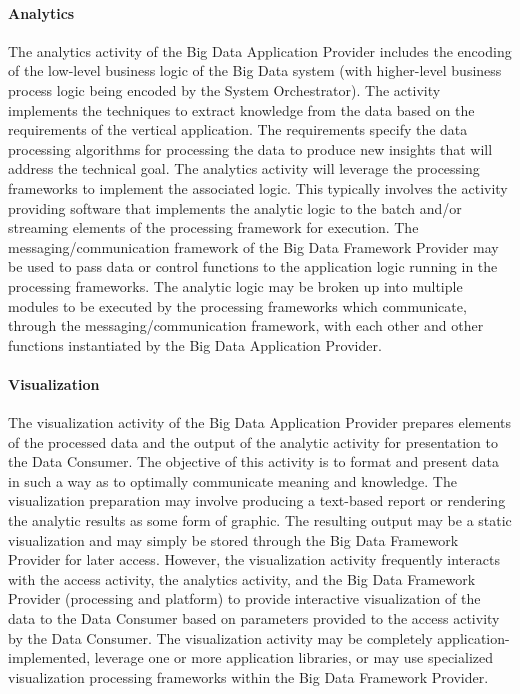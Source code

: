 \documentclass[10pt]{article}
\begin{document}
\paragraph{Analytics}

The analytics activity of the Big Data Application Provider includes
the encoding of the low-level business logic of the Big Data system
(with higher-level business process logic being encoded by the System
Orchestrator). The activity implements the techniques to extract
knowledge from the data based on the requirements of the vertical
application. The requirements specify the data processing algorithms
for processing the data to produce new insights that will address the
technical goal. The analytics activity will leverage the processing
frameworks to implement the associated logic. This typically involves
the activity providing software that implements the analytic logic to
the batch and/or streaming elements of the processing framework for
execution. The messaging/communication framework of the Big Data
Framework Provider may be used to pass data or control functions to
the application logic running in the processing frameworks. The
analytic logic may be broken up into multiple modules to be executed
by the processing frameworks which communicate, through the
messaging/communication framework, with each other and other functions
instantiated by the Big Data Application Provider.

\paragraph{Visualization}

The visualization activity of the Big Data Application Provider
prepares elements of the processed data and the output of the analytic
activity for presentation to the Data Consumer. The objective of this
activity is to format and present data in such a way as to optimally
communicate meaning and knowledge. The visualization preparation may
involve producing a text-based report or rendering the analytic
results as some form of graphic. The resulting output may be a static
visualization and may simply be stored through the Big Data Framework
Provider for later access. However, the visualization activity
frequently interacts with the access activity, the analytics activity,
and the Big Data Framework Provider (processing and platform) to
provide interactive visualization of the data to the Data Consumer
based on parameters provided to the access activity by the Data
Consumer. The visualization activity may be completely
application-implemented, leverage one or more application libraries,
or may use specialized visualization processing frameworks within the
Big Data Framework Provider.
\end{document}
